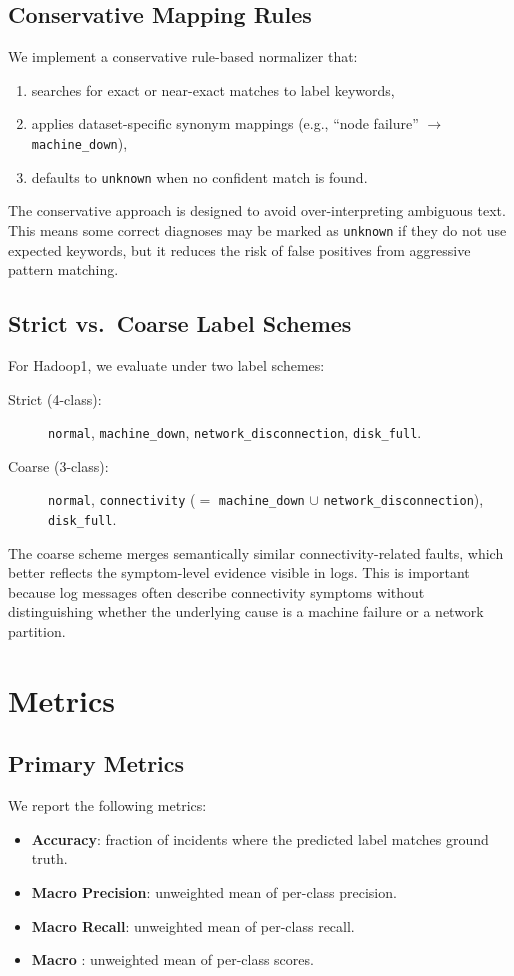 \subsection{Conservative Mapping Rules}
We implement a conservative rule-based normalizer that:
\begin{enumerate}
  \item searches for exact or near-exact matches to label keywords,
  \item applies dataset-specific synonym mappings (e.g., ``node failure'' $\rightarrow$
        \texttt{machine\_down}),
  \item defaults to \texttt{unknown} when no confident match is found.
\end{enumerate}

The conservative approach is designed to avoid over-interpreting ambiguous text. This means some
correct diagnoses may be marked as \texttt{unknown} if they do not use expected keywords, but it
reduces the risk of false positives from aggressive pattern matching.

\subsection{Strict vs.\ Coarse Label Schemes}
For Hadoop1, we evaluate under two label schemes:
\begin{description}
  \item[Strict (4-class):] \texttt{normal}, \texttt{machine\_down},
        \texttt{network\_disconnection}, \texttt{disk\_full}.
  \item[Coarse (3-class):] \texttt{normal}, \texttt{connectivity}
        ($=$ \texttt{machine\_down} $\cup$ \texttt{network\_disconnection}), \texttt{disk\_full}.
\end{description}

The coarse scheme merges semantically similar connectivity-related faults, which better reflects
the symptom-level evidence visible in logs. This is important because log messages often describe
connectivity symptoms without distinguishing whether the underlying cause is a machine failure or a
network partition.

\section{Metrics}

\subsection{Primary Metrics}
We report the following metrics:
\begin{itemize}
  \item \textbf{Accuracy}: fraction of incidents where the predicted label matches ground truth.
  \item \textbf{Macro Precision}: unweighted mean of per-class precision.
  \item \textbf{Macro Recall}: unweighted mean of per-class recall.
  \item \textbf{Macro \fone{}}: unweighted mean of per-class \fone{} scores.
\end{itemize}

